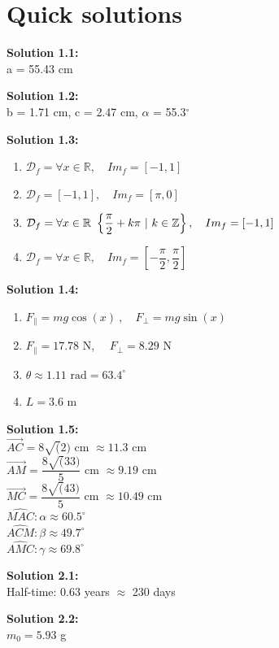 \documentclass{article}
\newcommand{\solution}[2][]{%
  \par\noindent\textbf{Solution #1:\\} #2\par \vspace*{.25cm}
}
\begin{document}
\newpage
\part*{Quick solutions}
\solution[1.1]{
  a = 55.43 cm
}

\solution[1.2]{
  b = 1.71 cm, c = 2.47 cm, $\alpha$ = 55.3$^\circ$
}

\solution[1.3]{\vspace*{-.5cm}
  \begin{enumerate}
    \item $\mathcal{D}_f = \forall x \in \mathbb{R}, \quad Im_f = \left[-1,1\right]$
    \item $\mathcal{D}_f = \left[-1,1\right], \quad Im_f = \left[\pi, 0\right]$
    \item $\mathcal{D}_f = \forall x \in \mathbb{R} \ \left\{\dfrac{\pi}{2}+k\pi \ |\  k \in \mathbb{Z}\right\}, \quad Im_f = \left[-1,1\right]$
    \item $\mathcal{D}_f = \forall x \in \mathbb{R}, \quad Im_f = \left[-\dfrac{\pi}{2}, \dfrac{\pi}{2}\right]$
  \end{enumerate}
}

\solution[1.4]{
  \vspace*{-0.5cm}
  \begin{enumerate}[label=\alph*.]
    \item $F_\parallel = mg\cos(x)\ , \quad F_\perp = mg\sin(x)$
    \item $F_\parallel = 17.78$ N, $\quad F_\perp = 8.29$ N
    \item $\theta \approx 1.11 \text{ rad} = 63.4^\circ$
    \item $L = 3.6$ m
  \end{enumerate}
}

\solution[1.5]{
  $\overrightarrow{AC} = 8\sqrt(2)$ cm $\approx 11.3$ cm\\[2ex]
  $\overrightarrow{AM} = \dfrac{8\sqrt(33)}{5}$ cm $\approx 9.19$ cm\\[2ex]
  $\overrightarrow{MC} = \dfrac{8\sqrt(43)}{5}$ cm $\approx 10.49$ cm\\[2ex]
  $\widehat{MAC}: \alpha \approx 60.5^\circ $\\[2ex]
  $\widehat{ACM}: \beta \approx 49.7^\circ$\\[2ex]
  $\widehat{AMC}: \gamma \approx 69.8^\circ$
}

\solution[2.1]{
  Half-time: 0.63 years $\approx$ 230 days
}

\solution[2.2]{
  $m_0 = 5.93$ g
}
\end{document}

